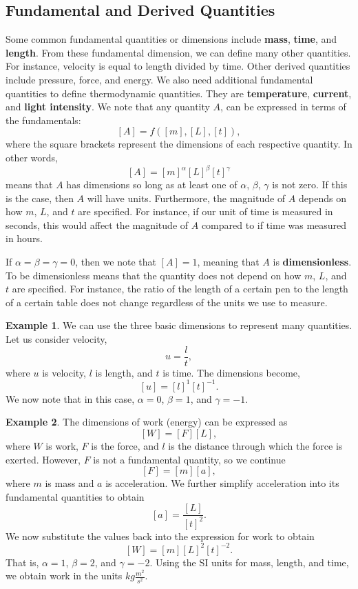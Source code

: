 \documentclass[11pt]{article}
\theoremstyle{plain} %
\theoremstyle{definition}
\theoremstyle{example}
\newtheorem*{example}{Example}
\theoremstyle{remark}
\begin{document}
\subsection{Fundamental and Derived Quantities}

Some common fundamental quantities or dimensions include \textbf{mass}, \textbf{time}, and \textbf{length}. From these fundamental dimension, we can define many other quantities. For instance, velocity is equal to length divided by time. Other derived quantities include pressure, force, and energy. We also need additional fundamental quantities to define thermodynamic quantities. They are \textbf{temperature}, \textbf{current}, and \textbf{light intensity}. We note that any quantity $A$, can be expressed in terms of the fundamentals:
$$[A] = f\left([m],[L],[t]\right),$$
where the square brackets represent the dimensions of each respective quantity. In other words,
$$[A] = [m]^{\alpha}[L]^{\beta}[t]^{\gamma}$$
means that $A$ has dimensions so long as at least one of $\alpha$, $\beta$, $\gamma$ is not zero. If this is the case, then $A$ will have units. Furthermore, the magnitude of $A$ depends on how $m$, $L$, and $t$ are specified. For instance, if our unit of time is measured in seconds, this would affect the magnitude of $A$ compared to if time was measured in hours. 

If $\alpha = \beta = \gamma = 0$, then we note that $[A]  = 1$, meaning that $A$ is \textbf{dimensionless}. To be dimensionless means that the quantity does not depend on how $m$, $L$, and $t$ are specified. For instance, the ratio of the length of a certain pen to the length of a certain table does not change regardless of the units we use to measure. 

\begin{example}We can use the three basic dimensions to represent many quantities. Let us consider velocity, 
$$u = \frac{l}{t},$$
where $u$ is velocity, $l$ is length, and $t$ is time. The dimensions become,
$$[u] = [l]^1[t]^{-1}.$$
We now note that in this case, $\alpha = 0$, $\beta = 1$, and $\gamma = -1$. 
\end{example}

\begin{example}
The dimensions of work (energy) can be expressed as 
$$[W] = [F][L],$$
where $W$ is work, $F$ is the force, and $l$ is the distance through which the force is exerted. However, $F$ is not a fundamental quantity, so we continue
$$[F] = [m][a],$$
where $m$ is mass and $a$ is acceleration. We further simplify acceleration into its fundamental quantities to obtain 
$$[a] = \frac{[L]}{[t]^2}.$$
We now substitute the values back into the expression for work to obtain 
$$[W] = [m][L]^2[t]^{-2}.$$
That is, $\alpha = 1$, $\beta = 2$, and $\gamma = -2$. Using the SI units for mass, length, and time, we obtain work in the units $kg\frac{m^2}{s^2}$. 
\end{example}
\end{document}
